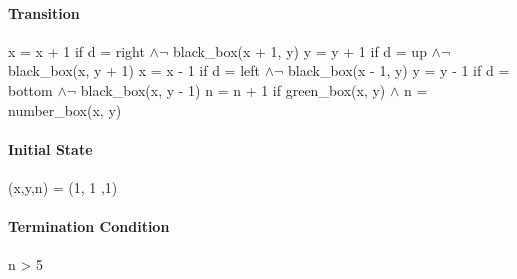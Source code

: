 \documentclass[a4paper,12pt]{article}
\begin{document}
      \paragraph{Transition}  
	x = x + 1 if d = right $\wedge \neg$ black\_box(x + 1, y) \newline
	y = y + 1 if d = up $\wedge \neg$ black\_box(x, y + 1) \newline
	x = x - 1 if d = left $\wedge \neg$ black\_box(x - 1, y) \newline
	y = y - 1 if d = bottom $\wedge \neg$ black\_box(x, y - 1) \newline
	n = n + 1 if green\_box(x, y) $\wedge$ n = number\_box(x, y) 
      
      \paragraph{Initial State}
      (x,y,n) = (1, 1 ,1)
      
      \paragraph{Termination Condition}
      n > 5
    
\end{document}
